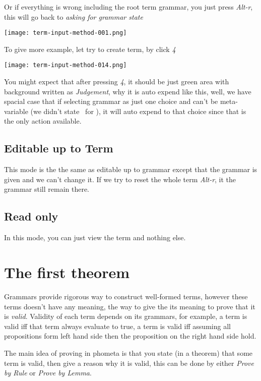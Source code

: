 \documentclass[master.tex]{subfiles}
\begin{document}
Or if everything is wrong including the root term grammar, you just press
\emph{Alt-r}, this will go back to \emph{asking for grammar state}

\centerline{\texttt{[image: term-input-method-001.png]}}

To give more example, let try to create  term, by click \emph{4}

\centerline{\texttt{[image: term-input-method-014.png]}}

You might expect that after pressing \emph{4}, it should be just green area with
background written as \emph{Judgement}, why it is auto expend like this, well,
we have spacial case that if selecting grammar as just one choice and can't be
meta-variable (we didn't state \kVarRegex\ for ), it will auto
expend to that choice since that is the only action available.

\subsection{Editable up to Term}
This mode is the the same as editable up to grammar except that the grammar is
given and we can't change it. If we try to reset the whole term \emph{Alt-r}, it
the grammar still remain there.

\subsection{Read only}
In this mode, you can just view the term and nothing else.

\section{The first theorem}

Grammars provide rigorous way to construct well-formed terms, however these
terms doesn't have any meaning, the way to give the its meaning to prove that it
is \emph{valid}. Validity of each term depends on its grammars, for example,
a  term is valid iff that term always evaluate to true, a
 term is valid iff assuming all propositions form left hand
side then the proposition on the right hand side hold.

The main idea of proving in phometa is that you state (in a theorem) that some
term is valid, then give a reason why it is valid, this can be done by either
\emph{Prove by Rule} or \emph{Prove by Lemma}.
\end{document}
